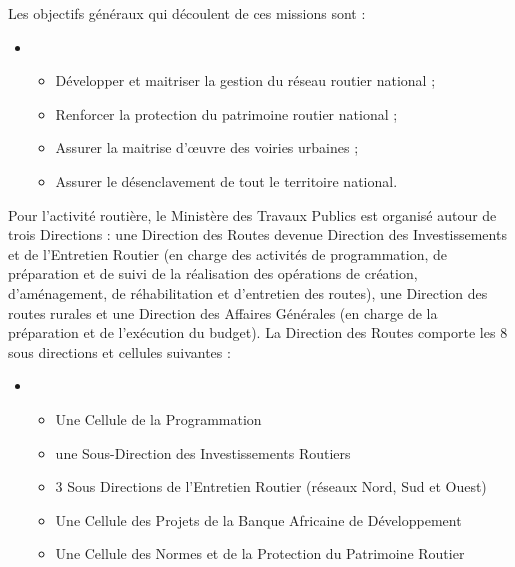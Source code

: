 Les objectifs généraux qui découlent de ces missions sont :
\begin{itemize}
\item[] 
\begin{itemize}
\item Développer et maitriser la gestion du réseau routier national ;
\item Renforcer la protection du patrimoine routier national ;
\item Assurer la maitrise d'œuvre des voiries urbaines ;
\item Assurer le désenclavement de tout le territoire national.
\end{itemize}
\end{itemize}
Pour l'activité routière, le Ministère des Travaux Publics est organisé autour de trois Directions : une Direction des Routes devenue Direction des Investissements et de l'Entretien Routier (en charge des activités de programmation, de préparation et de suivi de la réalisation des opérations de création, d'aménagement, de réhabilitation et d'entretien des routes), une Direction des routes rurales et une Direction des Affaires Générales (en charge de la préparation et de l'exécution du budget). La Direction des Routes comporte les 8 sous directions et cellules suivantes :
\begin{itemize}
\item[] 
\begin{itemize}
\item Une Cellule de la Programmation
\item une Sous-Direction des Investissements Routiers
\item 3 Sous Directions de l'Entretien Routier (réseaux Nord, Sud et Ouest)
\item Une Cellule des Projets de la Banque Africaine de Développement 
\item Une Cellule des Normes et de la Protection du Patrimoine Routier
\end{itemize}
\end{itemize}

